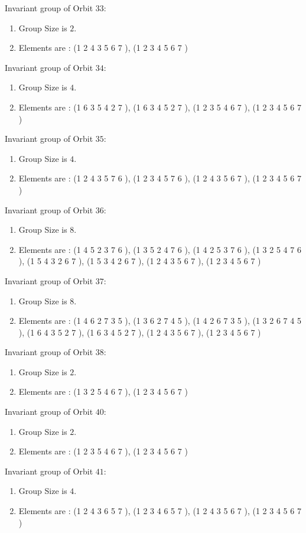 \documentclass[12pt]{article}
\begin{document}
Invariant group of Orbit $33$:
\begin{enumerate}
\item Group Size is $2$.
\item Elements are : (1 2 4 3 5 6 7  ), (1 2 3 4 5 6 7  )
\end{enumerate}
Invariant group of Orbit $34$:
\begin{enumerate}
\item Group Size is $4$.
\item Elements are : (1 6 3 5 4 2 7  ), (1 6 3 4 5 2 7  ), (1 2 3 5 4 6 7  ), (1 2 3 4 5 6 7  )
\end{enumerate}
Invariant group of Orbit $35$:
\begin{enumerate}
\item Group Size is $4$.
\item Elements are : (1 2 4 3 5 7 6  ), (1 2 3 4 5 7 6  ), (1 2 4 3 5 6 7  ), (1 2 3 4 5 6 7  )
\end{enumerate}
Invariant group of Orbit $36$:
\begin{enumerate}
\item Group Size is $8$.
\item Elements are : (1 4 5 2 3 7 6  ), (1 3 5 2 4 7 6  ), (1 4 2 5 3 7 6  ), (1 3 2 5 4 7 6  ), (1 5 4 3 2 6 7  ), (1 5 3 4 2 6 7  ), (1 2 4 3 5 6 7  ), (1 2 3 4 5 6 7  )
\end{enumerate}
Invariant group of Orbit $37$:
\begin{enumerate}
\item Group Size is $8$.
\item Elements are : (1 4 6 2 7 3 5  ), (1 3 6 2 7 4 5  ), (1 4 2 6 7 3 5  ), (1 3 2 6 7 4 5  ), (1 6 4 3 5 2 7  ), (1 6 3 4 5 2 7  ), (1 2 4 3 5 6 7  ), (1 2 3 4 5 6 7  )
\end{enumerate}
Invariant group of Orbit $38$:
\begin{enumerate}
\item Group Size is $2$.
\item Elements are : (1 3 2 5 4 6 7  ), (1 2 3 4 5 6 7  )
\end{enumerate}
Invariant group of Orbit $40$:
\begin{enumerate}
\item Group Size is $2$.
\item Elements are : (1 2 3 5 4 6 7  ), (1 2 3 4 5 6 7  )
\end{enumerate}
Invariant group of Orbit $41$:
\begin{enumerate}
\item Group Size is $4$.
\item Elements are : (1 2 4 3 6 5 7  ), (1 2 3 4 6 5 7  ), (1 2 4 3 5 6 7  ), (1 2 3 4 5 6 7  )
\end{enumerate}
\end{document}
